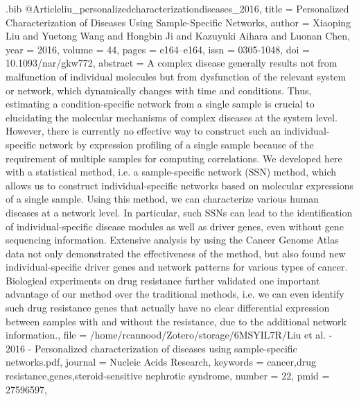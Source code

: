 \documentclass[
  table,
  10pt,
  a4paper]{article}
\begin{document}
\begin{filecontents}{\jobname.bib}
@Article{liu_personalizedcharacterizationdiseases_2016,
	title = {Personalized Characterization of Diseases Using Sample-Specific Networks},
	author = {Xiaoping Liu and Yuetong Wang and Hongbin Ji and Kazuyuki Aihara and Luonan Chen},
	year = {2016},
	volume = {44},
	pages = {e164--e164},
	issn = {0305-1048},
	doi = {10.1093/nar/gkw772},
	abstract = {A complex disease generally results not from malfunction of individual molecules but from dysfunction of the relevant system or network, which dynamically changes with time and conditions. Thus, estimating a condition-specific network from a single sample is crucial to elucidating the molecular mechanisms of complex diseases at the system level. However, there is currently no effective way to construct such an individual-specific network by expression profiling of a single sample because of the requirement of multiple samples for computing correlations. We developed here with a statistical method, i.e. a sample-specific network (SSN) method, which allows us to construct individual-specific networks based on molecular expressions of a single sample. Using this method, we can characterize various human diseases at a network level. In particular, such SSNs can lead to the identification of individual-specific disease modules as well as driver genes, even without gene sequencing information. Extensive analysis by using the Cancer Genome Atlas data not only demonstrated the effectiveness of the method, but also found new individual-specific driver genes and network patterns for various types of cancer. Biological experiments on drug resistance further validated one important advantage of our method over the traditional methods, i.e. we can even identify such drug resistance genes that actually have no clear differential expression between samples with and without the resistance, due to the additional network information.},
	file = {/home/rcannood/Zotero/storage/6MSYIL7R/Liu et al. - 2016 - Personalized characterization of diseases using sample-specific networks.pdf},
	journal = {Nucleic Acids Research},
	keywords = {cancer,drug resistance,genes,steroid-sensitive nephrotic syndrome},
	number = {22},
	pmid = {27596597},
}


\end{filecontents}
\end{document}
